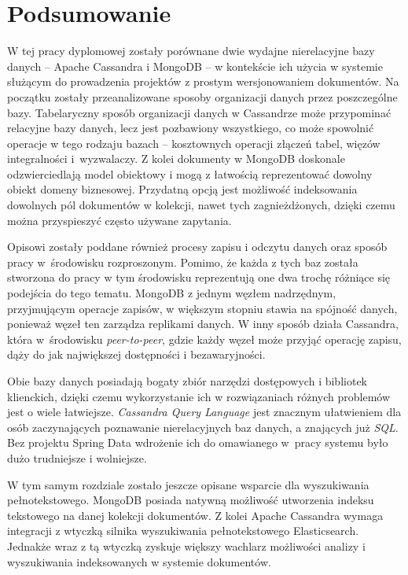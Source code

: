\chapter{Podsumowanie}

W tej pracy dyplomowej zostały porównane dwie wydajne nierelacyjne bazy danych -- Apache Cassandra i MongoDB -- w kontekście ich użycia w systemie służącym do prowadzenia projektów z prostym wersjonowaniem dokumentów.
Na początku zostały przeanalizowane sposoby organizacji danych przez poszczególne bazy.
Tabelaryczny sposób organizacji danych w Cassandrze może przypominać relacyjne bazy danych, lecz jest pozbawiony wszystkiego, co może spowolnić operacje w tego rodzaju bazach -- kosztownych operacji złączeń tabel, więzów integralności i~wyzwalaczy.
Z kolei dokumenty w MongoDB doskonale odzwierciedlają model obiektowy i mogą z łatwością reprezentować dowolny obiekt domeny biznesowej.
Przydatną opcją jest możliwość indeksowania dowolnych pól dokumentów w kolekcji, nawet tych zagnieżdżonych, dzięki czemu można przyspieszyć często używane zapytania.

Opisowi zostały poddane również procesy zapisu i odczytu danych oraz sposób pracy w~środowisku rozproszonym.
Pomimo, że każda z tych baz została stworzona do pracy w tym środowisku reprezentują one dwa trochę różniące się podejścia do tego tematu.
MongoDB z jednym węzłem nadrzędnym, przyjmującym operacje zapisów, w większym stopniu stawia na spójność danych, ponieważ węzeł ten zarządza replikami danych.
W inny sposób działa Cassandra, która w~środowisku \textit{peer-to-peer}, gdzie każdy węzeł może przyjąć operację zapisu, dąży do jak największej dostępności i bezawaryjności.

Obie bazy danych posiadają bogaty zbiór narzędzi dostępowych i bibliotek klienckich, dzięki czemu wykorzystanie ich w rozwiązaniach różnych problemów jest o wiele łatwiejsze.
\textit{Cassandra Query Language} jest znacznym ułatwieniem dla osób zaczynających poznawanie nierelacyjnych baz danych, a znających już \textit{SQL}.
Bez projektu Spring Data wdrożenie ich do omawianego w~pracy systemu było dużo trudniejsze i wolniejsze.

W tym samym rozdziale zostało jeszcze opisane wsparcie dla wyszukiwania pełnotekstowego. 
MongoDB posiada natywną możliwość utworzenia indeksu tekstowego na danej kolekcji dokumentów.
Z kolei Apache Cassandra wymaga integracji z wtyczką silnika wyszukiwania pełnotekstowego Elasticsearch.
Jednakże wraz z tą wtyczką zyskuje większy wachlarz możliwości analizy i wyszukiwania indeksowanych w systemie dokumentów.

